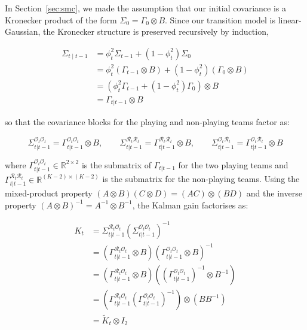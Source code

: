 In Section~\ref{sec:smc}, we made the assumption that our initial covariance is a Kronecker product of the form $\Sigma_0 = \Gamma_0 \otimes B$. Since our transition model is linear-Gaussian, the Kronecker structure is preserved recursively by induction, 

\begin{align}
    \Sigma_{t \mid t-1} &= \phi_t^2 \Sigma_{t-1} + (1 - \phi_t^2) \Sigma_0 \nonumber \\
    &= \phi_t^2 (\Gamma_{t-1} \otimes B) + (1 - \phi_t^2) (\Gamma_0 \otimes B) \nonumber \\
    &= \left( \phi_t^2 \Gamma_{t-1} + (1 - \phi_t^2) \Gamma_0 \right) \otimes B \nonumber \\
    &= \Gamma_{t|t-1} \otimes B \nonumber
\end{align}

so that the covariance blocks for the playing and non-playing teams factor as:

\begin{equation}
    \Sigma_{t|t-1}^{\mathcal{O}_t\mathcal{O}_t} = \Gamma^{\mathcal{O}_t\mathcal{O}_t}_{t|t-1} \otimes B, \qquad
    \Sigma_{t|t-1}^{\mathcal{R}_t\mathcal{R}_t} = \Gamma^{\mathcal{R}_t\mathcal{R}_t}_{t|t-1} \otimes B, \qquad
    \Sigma_{t|t-1}^{\mathcal{O}_t\mathcal{R}_t} = \Gamma^{\mathcal{O}_t\mathcal{R}_t}_{t|t-1} \otimes B \nonumber
\end{equation}

where $\Gamma^{\mathcal{O}_t\mathcal{O}_t}_{t|t-1} \in \mathbb{R}^{2 \times 2}$ is the submatrix of $\Gamma_{t|t-1}$ for the two playing teams and $\Gamma^{\mathcal{R}_t\mathcal{R}_t}_{t|t-1} \in \mathbb{R}^{(K-2) \times (K-2)}$ is the submatrix for the non-playing teams. Using the mixed-product property $(A \otimes B)(C \otimes D) = (AC) \otimes (BD)$ and the inverse property $(A \otimes B)^{-1} = A^{-1} \otimes B^{-1}$, the Kalman gain factorises as:

\begin{align}
    K_t &= \Sigma_{t|t-1}^{\mathcal{R}_t\mathcal{O}_t} \left( \Sigma_{t|t-1}^{\mathcal{O}_t\mathcal{O}_t} \right)^{-1} \nonumber \\
    &= \left( \Gamma^{\mathcal{R}_t\mathcal{O}_t}_{t|t-1} \otimes B \right) \left( \Gamma^{\mathcal{O}_t\mathcal{O}_t}_{t|t-1} \otimes B \right)^{-1} \nonumber \\
    &= \left( \Gamma^{\mathcal{R}_t\mathcal{O}_t}_{t|t-1} \otimes B \right) \left( (\Gamma^{\mathcal{O}_t\mathcal{O}_t}_{t|t-1})^{-1} \otimes B^{-1} \right) \nonumber \\
    &= \left( \Gamma^{\mathcal{R}_t\mathcal{O}_t}_{t|t-1} (\Gamma^{\mathcal{O}_t\mathcal{O}_t}_{t|t-1})^{-1} \right) \otimes \left( B B^{-1} \right) \nonumber \\
    &= \tilde{K}_t \otimes I_2 \nonumber
\end{align}

